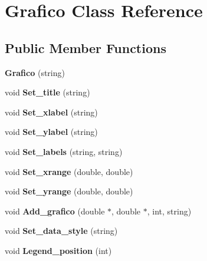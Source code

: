 \hypertarget{classGrafico}{
\section{Grafico Class Reference}
\label{classGrafico}
}
\subsection*{Public Member Functions}
\begin{DoxyCompactItemize}
\item 
\hypertarget{classGrafico_aadf0c06b1014d6dc134c8c49a582316e}{
{\bfseries Grafico} (string)}
\label{classGrafico_aadf0c06b1014d6dc134c8c49a582316e}

\item 
\hypertarget{classGrafico_a8e6649a1af93b702263b994b21dbc462}{
void {\bfseries Set\_\-title} (string)}
\label{classGrafico_a8e6649a1af93b702263b994b21dbc462}

\item 
\hypertarget{classGrafico_ac826d42294c1a312d74da3333dc8e5dc}{
void {\bfseries Set\_\-xlabel} (string)}
\label{classGrafico_ac826d42294c1a312d74da3333dc8e5dc}

\item 
\hypertarget{classGrafico_af2bfef0c397a17708240262d0461fcb6}{
void {\bfseries Set\_\-ylabel} (string)}
\label{classGrafico_af2bfef0c397a17708240262d0461fcb6}

\item 
\hypertarget{classGrafico_ab0e092d9bebb8edd6f0c2dcdab2cf06f}{
void {\bfseries Set\_\-labels} (string, string)}
\label{classGrafico_ab0e092d9bebb8edd6f0c2dcdab2cf06f}

\item 
\hypertarget{classGrafico_a8cb74b0876afde61846069754544073b}{
void {\bfseries Set\_\-xrange} (double, double)}
\label{classGrafico_a8cb74b0876afde61846069754544073b}

\item 
\hypertarget{classGrafico_a32f216386dea3383cc05338e901f72ce}{
void {\bfseries Set\_\-yrange} (double, double)}
\label{classGrafico_a32f216386dea3383cc05338e901f72ce}

\item 
\hypertarget{classGrafico_a444a3b0ae461aee9b4ef014147386c07}{
void {\bfseries Add\_\-grafico} (double $\ast$, double $\ast$, int, string)}
\label{classGrafico_a444a3b0ae461aee9b4ef014147386c07}

\item 
\hypertarget{classGrafico_aae244e1e2f84a14f3981c360f72108fc}{
void {\bfseries Set\_\-data\_\-style} (string)}
\label{classGrafico_aae244e1e2f84a14f3981c360f72108fc}

\item 
\hypertarget{classGrafico_a5f3691106d812f2fea2e7d379078bfb4}{
void {\bfseries Legend\_\-position} (int)}
\label{classGrafico_a5f3691106d812f2fea2e7d379078bfb4}

\end{DoxyCompactItemize}
